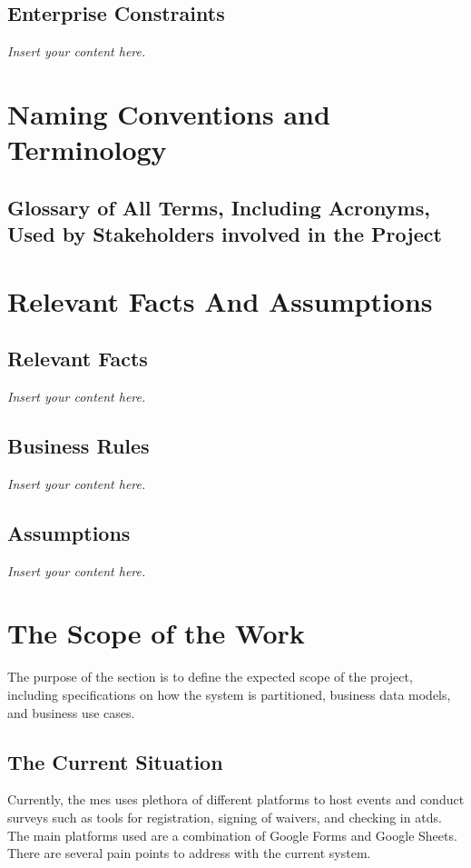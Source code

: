 \documentclass[12pt]{article}
\newcommand{\lips}{\textit{Insert your content here.}}
\begin{document}
\subsection{Enterprise Constraints}
\lips

\section{Naming Conventions and Terminology}
\subsection{Glossary of All Terms, Including Acronyms, Used by Stakeholders
involved in the Project}
\printglossaries

\section{Relevant Facts And Assumptions}
\subsection{Relevant Facts}
\lips
\subsection{Business Rules}
\lips
\subsection{Assumptions}
\lips

\section{The Scope of the Work}

The purpose of the section is to define the expected scope of the project, including specifications on how the system is partitioned, business data models, and business use cases.

\subsection{The Current Situation}

Currently, the \gls{mes} uses plethora of different platforms to host events and conduct surveys such as tools for registration, signing of waivers, and checking in \glspl{atd}. The main platforms used are a combination of Google Forms and Google Sheets. There are several pain points to address with the current system.
\end{document}
